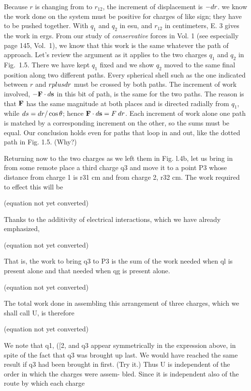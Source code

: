 Because $r$ is changing from  to $r_{12}$, the increment of
displacement is $-d r$. we know the work done on the system must be
positive for charges of like sign; they have to be pushed together.
With $q_1$ and $q_2$ in esu, and $r_{12}$ in centimeters, E. 3 gives
the work in ergs. From our study of \emph{conservative} forces in
Vol. 1 (see especially page 145, Vol.~1), we know that this work is
the same whatever the path of approach. Let's review the argument as
it applies to the two charges $q_1$ and $q_2$ in Fig.~1.5. There we
have kept $q_1$ fixed and we show $q_2$ moved to the same final
position along two different paths. Every spherical shell such as the
one indicated between $r$ and $r plus d r$ must be crossed by both
paths. The increment of work involved, $-\mathbf{F}\cdot d\mathbf{s}$ in this bit of path,
is the same for the two paths. The reason is that $\mathbf{F}$ has the same
magnitude at both places and is directed radially from $q_1$, while
$d s = d r/\cos\theta$; hence $\mathbf{F}\cdot d\mathbf{s} = F\: d r$. Each increment of work
alone one path is matched by a corresponding increment on the other,
so the sums must be equal. Our conclusion
holds even for paths that loop in and out, like the dotted path in
Fig. 1.5. (Why?)

Returning now to the two charges as we left them in Fig. l.4b, let
us bring in from some remote place a third charge q3 and move it to a
point P3 whose distance from charge 1 is r31 cm and from charge 2,
r32 cm. The work required to effect this will be

(equation not yet converted)

Thanks to the additivity of electrical interactions, which we have
already emphasized,

(equation not yet converted)

That is, the work to bring q3 to P3 is the sum of the work needed when
ql is present alone and that needed when qg is present alone.

(equation not yet converted)

The total work done in assembling this arrangement of three charges,
which we shall call U, is therefore

(equation not yet converted)

We note that q1, ([2, and q3 appear symmetrically in the expression
above, in spite of the fact that q3 was brought up last. We would have
reached the same result if q3 had been brought in first. (Try it.)
Thus U is independent of the order in which the charges were assem-
bled. Since it is independent also of the route by which each charge

